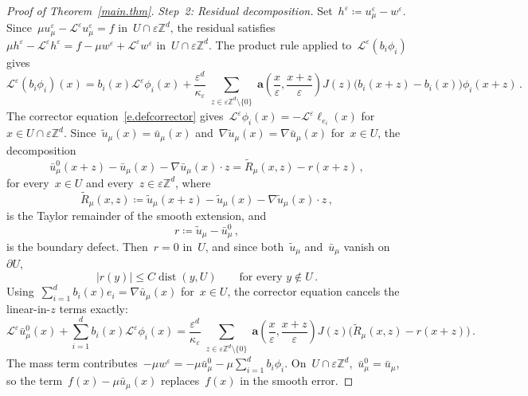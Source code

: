 \documentclass[11pt]{amsart}
\theoremstyle{plain}
\theoremstyle{definition}
\theoremstyle{remark}
\newcommand{\Zd}{\mathbb{Z}^d}
\renewcommand{\a}{\mathbf{a}}
\newcommand{\eps}{\varepsilon}
\begin{document}
\begin{proof}[Proof of Theorem~\ref{main.thm}]
		\emph{Step~2: Residual decomposition.}
		Set~$h^\eps \coloneqq u^\eps_\mu - w^\eps$.
		Since~$\mu u^\eps_\mu - \mathcal{L}^\eps u^\eps_\mu = f$ in~$U \cap \eps\Zd$, the residual satisfies~$\mu h^\eps - \mathcal{L}^\eps h^\eps = f - \mu w^\eps + \mathcal{L}^\eps w^\eps$ in~$U \cap \eps\Zd$.
		The product rule applied to~$\mathcal{L}^\eps(b_i \phi_i)$ gives
		\begin{equation}
			\label{e.product.bi.phi}
			\mathcal{L}^\eps(b_i \phi_i)(x) = b_i(x) \mathcal{L}^\eps\phi_i(x) + \frac{\eps^d}{\kappa_\eps}\sum_{\substack{z \in \eps\Zd \setminus \{0\}}} \a\left(\frac{x}{\eps},\frac{x{+}z}{\eps}\right) J(z)\bigl(b_i(x{+}z) - b_i(x)\bigr)\phi_i(x{+}z)\,.
		\end{equation}
		The corrector equation~\eqref{e.defcorrector} gives~$\mathcal{L}^\eps\phi_i(x) = -\mathcal{L}^\eps\ell_{e_i}(x)$ for~$x \in U \cap \eps\Zd$.
		Since~$\widetilde u_\mu(x) = \bar u_\mu(x)$ and~$\nabla\widetilde u_\mu(x) = \nabla\bar u_\mu(x)$ for~$x \in U$, the decomposition
		\[
		\bar u_\mu^0(x{+}z) - \bar u_\mu(x) - \nabla\bar u_\mu(x) \cdot z
		= \widetilde R_\mu(x,z) - r(x{+}z)\,,
		\]
		for every~$x \in U$ and every~$z \in \eps\Zd$, where
		\begin{equation}
			\label{e.Rtilde}
			\widetilde R_\mu(x,z) \coloneqq \widetilde u_\mu(x{+}z) - \widetilde u_\mu(x) - \nabla\widetilde u_\mu(x) \cdot z\,,
		\end{equation}
		is the Taylor remainder of the smooth extension, and
		\begin{equation}
			\label{e.rdef}
			r \coloneqq \widetilde u_\mu - \bar u_\mu^0\,,
		\end{equation}
		is the boundary defect.
		Then~$r = 0$ in~$U$, and since both~$\widetilde u_\mu$ and~$\bar u_\mu$ vanish on~$\partial U$,
		\begin{equation}
			\label{e.r.lip}
			|r(y)| \le C\operatorname{dist}(y, U)
			\qquad \text{for every } y \notin U\,.
		\end{equation}
		Using~$\sum_{i=1}^{d} b_i(x) e_i = \nabla\bar u_\mu(x)$ for~$x \in U$, the corrector equation cancels the linear-in-$z$ terms exactly:
		\[
		\mathcal{L}^\eps\bar u_\mu^0(x) + \sum_{i=1}^d b_i(x) \mathcal{L}^\eps\phi_i(x)
		= \frac{\eps^d}{\kappa_\eps}\sum_{\substack{z \in \eps\Zd \setminus \{0\}}} \a\left(\frac{x}{\eps},\frac{x{+}z}{\eps}\right) J(z)\bigl(\widetilde R_\mu(x,z) - r(x{+}z)\bigr)\,.
		\]
		The mass term contributes~$-\mu w^\eps = -\mu \bar u_\mu^0 - \mu\sum_{i=1}^{d} b_i\phi_i$.
		On~$U \cap \eps\Zd$,~$\bar u_\mu^0 = \bar u_\mu$, so the term~$f(x) - \mu\bar u_\mu(x)$ replaces~$f(x)$ in the smooth error.

\end{proof}
\end{document}
